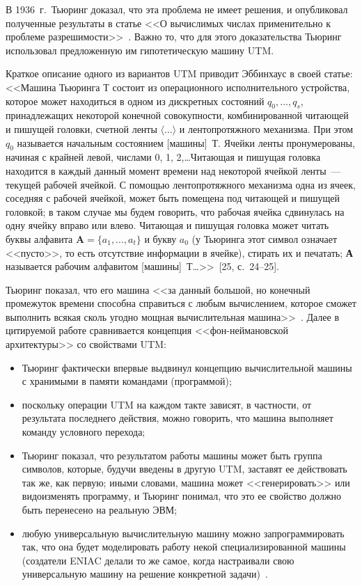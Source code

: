 \begin{multicols}{2}
      В 1936~г.\ Тьюринг доказал, что эта проблема не имеет решения, и опубликовал
полученные результаты в статье <<О вычислимых числах применительно к проблеме
разрешимости>>~\cite{28za}. Важно то, что для этого доказательства Тьюринг использовал
предложенную им гипотетическую машину UTM.

      Краткое описание одного из вариантов UTM приводит Эббинхаус в своей статье:
<<Машина Тьюринга Т состоит из операционного исполнительного устройства, которое может
находиться в одном из дискретных состояний $q_0, \ldots , q_s$, принадлежащих некоторой
конечной совокупности, комбинированной читающей и пишущей головки, счетной ленты
$\langle\ldots\rangle$ и лентопротяжного механизма. При этом $q_0$ называется начальным
состоянием [машины]~Т. Ячейки ленты пронумерованы, начиная с крайней левой, числами 0, 1,
2,\ldots Читающая и пишущая головка находится в каждый данный момент времени над
некоторой ячейкой ленты~--- текущей рабочей ячейкой. С помощью лентопротяжного
механизма одна из ячеек, соседняя с рабочей ячейкой, может быть помещена под читающей и
пишущей головкой; в таком случае мы будем говорить, что рабочая ячейка сдвинулась на одну
ячейку вправо или влево. Читающая и пишущая головка может читать буквы алфавита
$\mathbf{A} = \{ a_1, \ldots , a_t\}$ и букву $a_0$ (у Тьюринга этот символ означает <<пусто>>,
то есть отсутствие информации в ячейке), стирать их и печатать; \textbf{А} называется рабочим
алфавитом [машины]~Т\ldots >>~[25, с.~24--25].

      Тьюринг показал, что его машина <<за данный большой, но конечный промежуток
времени способна справиться с любым вычислением, которое сможет выполнить всякая сколь
угодно мощная вычислительная машина>>~\cite{26za}. Далее в цитируемой работе
сравнивается концепция <<фон-неймановской архитектуры>> со свойствами UTM:
      \begin{itemize}
\item Тьюринг фактически впервые выдвинул концепцию вычислительной машины с
хранимыми в памяти командами (программой);
\item поскольку операции UTM на каждом такте зависят, в частности, от результата
последнего действия, можно говорить, что машина выполняет команду условного
перехода;
\item Тьюринг показал, что результатом работы машины может быть группа символов,
которые, будучи введены в другую UTM, заставят ее действовать так же, как первую;
иными словами, машина может <<генерировать>> или видоизменять программу, и
Тьюринг понимал, что это ее свойство должно быть перенесено на реальную ЭВМ;
\item любую универсальную вычислительную машину можно запрограммировать так,
что она будет моделировать работу некой специализированной машины (создатели
ENIAC делали то же самое, когда настраивали свою универсальную машину на решение
конкретной задачи)~\cite{26za}.
\end{itemize}


\end{multicols}
